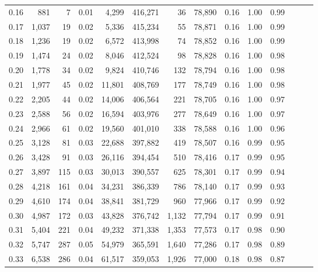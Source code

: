\begin{tabular}{rrrrrrrrrrrrrr}
0.16 &     881 &      7 &  0.01 &    4,299 &  416,271 &      36 &  78,890 &  0.16 &  1.00 &      0.99 \\
0.17 &   1,037 &     19 &  0.02 &    5,336 &  415,234 &      55 &  78,871 &  0.16 &  1.00 &      0.99 \\
0.18 &   1,236 &     19 &  0.02 &    6,572 &  413,998 &      74 &  78,852 &  0.16 &  1.00 &      0.99 \\
0.19 &   1,474 &     24 &  0.02 &    8,046 &  412,524 &      98 &  78,828 &  0.16 &  1.00 &      0.98 \\
0.20 &   1,778 &     34 &  0.02 &    9,824 &  410,746 &     132 &  78,794 &  0.16 &  1.00 &      0.98 \\
0.21 &   1,977 &     45 &  0.02 &   11,801 &  408,769 &     177 &  78,749 &  0.16 &  1.00 &      0.98 \\
0.22 &   2,205 &     44 &  0.02 &   14,006 &  406,564 &     221 &  78,705 &  0.16 &  1.00 &      0.97 \\
0.23 &   2,588 &     56 &  0.02 &   16,594 &  403,976 &     277 &  78,649 &  0.16 &  1.00 &      0.97 \\
0.24 &   2,966 &     61 &  0.02 &   19,560 &  401,010 &     338 &  78,588 &  0.16 &  1.00 &      0.96 \\
0.25 &   3,128 &     81 &  0.03 &   22,688 &  397,882 &     419 &  78,507 &  0.16 &  0.99 &      0.95 \\
0.26 &   3,428 &     91 &  0.03 &   26,116 &  394,454 &     510 &  78,416 &  0.17 &  0.99 &      0.95 \\
0.27 &   3,897 &    115 &  0.03 &   30,013 &  390,557 &     625 &  78,301 &  0.17 &  0.99 &      0.94 \\
0.28 &   4,218 &    161 &  0.04 &   34,231 &  386,339 &     786 &  78,140 &  0.17 &  0.99 &      0.93 \\
0.29 &   4,610 &    174 &  0.04 &   38,841 &  381,729 &     960 &  77,966 &  0.17 &  0.99 &      0.92 \\
0.30 &   4,987 &    172 &  0.03 &   43,828 &  376,742 &   1,132 &  77,794 &  0.17 &  0.99 &      0.91 \\
0.31 &   5,404 &    221 &  0.04 &   49,232 &  371,338 &   1,353 &  77,573 &  0.17 &  0.98 &      0.90 \\
0.32 &   5,747 &    287 &  0.05 &   54,979 &  365,591 &   1,640 &  77,286 &  0.17 &  0.98 &      0.89 \\
0.33 &   6,538 &    286 &  0.04 &   61,517 &  359,053 &   1,926 &  77,000 &  0.18 &  0.98 &      0.87 \\

\end{tabular}

